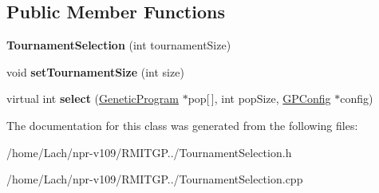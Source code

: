\subsection*{Public Member Functions}
\begin{DoxyCompactItemize}
\item 
\hypertarget{classTournamentSelection_aff602e629dbc22462b1b5a7949e03a6d}{}\label{classTournamentSelection_aff602e629dbc22462b1b5a7949e03a6d} 
{\bfseries Tournament\+Selection} (int tournament\+Size)
\item 
\hypertarget{classTournamentSelection_ab2c08e2a0e0714fbc120568d1761da39}{}\label{classTournamentSelection_ab2c08e2a0e0714fbc120568d1761da39} 
void {\bfseries set\+Tournament\+Size} (int size)
\item 
\hypertarget{classTournamentSelection_aab1944102a8634c97528f4d63be6bb8d}{}\label{classTournamentSelection_aab1944102a8634c97528f4d63be6bb8d} 
virtual int {\bfseries select} (\hyperlink{classGeneticProgram}{Genetic\+Program} $\ast$pop\mbox{[}$\,$\mbox{]}, int pop\+Size, \hyperlink{classGPConfig}{G\+P\+Config} $\ast$config)
\end{DoxyCompactItemize}


The documentation for this class was generated from the following files\+:\begin{DoxyCompactItemize}
\item 
/home/\+Lach/npr-\/v109/\+R\+M\+I\+T\+G\+P../Tournament\+Selection.\+h\item 
/home/\+Lach/npr-\/v109/\+R\+M\+I\+T\+G\+P../Tournament\+Selection.\+cpp\end{DoxyCompactItemize}
